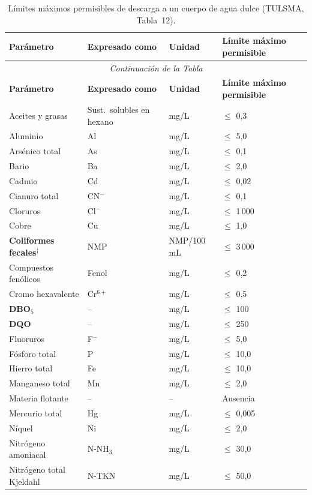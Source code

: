 \documentclass[12pt,a4paper]{article}
\begin{document}
\small
\begin{longtable}{p{4.5cm}p{2.0cm}p{2.0cm}p{3.5cm}}
\caption{L\'imites m\'aximos permisibles de descarga a un cuerpo de agua dulce (TULSMA, Tabla~12).}\\
\toprule
\textbf{Par\'ametro} & \textbf{Expresado como} & \textbf{Unidad} & \textbf{L\'imite m\'aximo permisible} \\
\midrule
\endfirsthead
\multicolumn{4}{c}{\small\itshape Continuaci\'on de la Tabla}\\
\toprule
\textbf{Par\'ametro} & \textbf{Expresado como} & \textbf{Unidad} & \textbf{L\'imite m\'aximo permisible} \\
\midrule
\endhead
\bottomrule
\endlastfoot
Aceites y grasas & Sust.\ solubles en hexano & mg/L & $\leq$ 0,3 \\
Aluminio & Al & mg/L & $\leq$ 5,0 \\
Ars\'enico total & As & mg/L & $\leq$ 0,1 \\
Bario & Ba & mg/L & $\leq$ 2,0 \\
Cadmio & Cd & mg/L & $\leq$ 0,02 \\
Cianuro total & CN$^-$ & mg/L & $\leq$ 0,1 \\
Cloruros & Cl$^-$ & mg/L & $\leq$ 1\,000 \\
Cobre & Cu & mg/L & $\leq$ 1,0 \\
\textbf{Coliformes fecales}$^\dagger$ & NMP & NMP/100 mL & $\leq$ 3\,000 \\
Compuestos fen\'olicos & Fenol & mg/L & $\leq$ 0,2 \\
Cromo hexavalente & Cr$^{6+}$ & mg/L & $\leq$ 0,5 \\
\textbf{DBO$_5$} & -- & mg/L & $\leq$ 100 \\
\textbf{DQO} & -- & mg/L & $\leq$ 250 \\
Fluoruros & F$^-$ & mg/L & $\leq$ 5,0 \\
F\'osforo total & P & mg/L & $\leq$ 10,0 \\
Hierro total & Fe & mg/L & $\leq$ 10,0 \\
Manganeso total & Mn & mg/L & $\leq$ 2,0 \\
Materia flotante & -- & -- & Ausencia \\
Mercurio total & Hg & mg/L & $\leq$ 0,005 \\
N\'iquel & Ni & mg/L & $\leq$ 2,0 \\
Nitr\'ogeno amoniacal & N-NH$_3$ & mg/L & $\leq$ 30,0 \\
Nitr\'ogeno total Kjeldahl & N-TKN & mg/L & $\leq$ 50,0 \\

\end{longtable}
\end{document}
